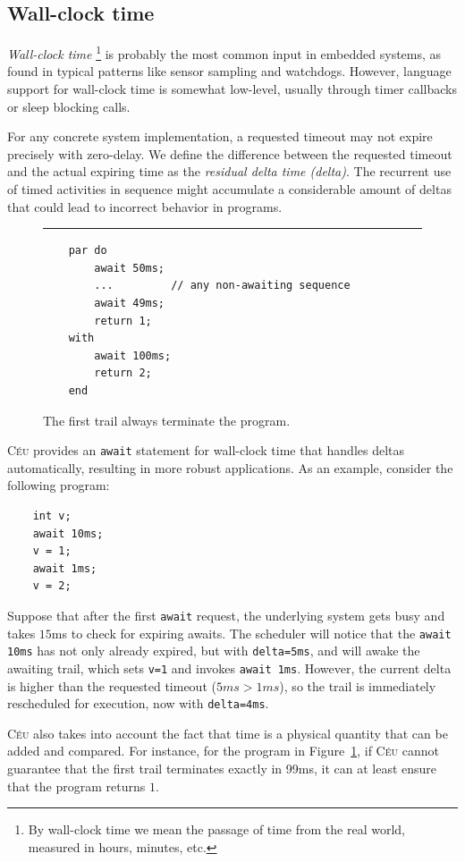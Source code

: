 \documentclass{sigplan-proc}
\newcommand{\2}{\;\;}
\newcommand{\5}{\;\;\;\;\;}
\newcommand{\CEU}{\textsc{C\'{e}u}}
\newcommand{\code}[1] {{\small{\texttt{#1}}}}
\begin{document}
\subsection{Wall-clock time}
\label{sec:ceu:time}

\emph{Wall-clock time}%
\footnote{
By wall-clock time we mean the passage of time from the real world, measured in 
hours, minutes, etc.
}
is probably the most common input in embedded systems, as found in typical 
patterns like sensor sampling and watchdogs.
However, language support for wall-clock time is somewhat low-level, usually 
through timer callbacks or sleep blocking calls.

For any concrete system implementation, a requested timeout may not expire 
precisely with zero-delay.
We define the difference between the requested timeout and the actual expiring 
time as the \emph{residual delta time (delta)}.
The recurrent use of timed activities in sequence might accumulate a 
considerable amount of deltas that could lead to incorrect behavior in 
programs.

\begin{figure}[t]
\rule{8.5cm}{0.37pt}
{\small
\begin{verbatim}
    par do
        await 50ms;
        ...         // any non-awaiting sequence
        await 49ms;
        return 1;
    with
        await 100ms;
        return 2;
    end
\end{verbatim}
}
\caption{ The first trail always terminate the program.
\label{lst:ceu:time}
}
\end{figure}

\CEU{} provides an \code{await} statement for wall-clock time that handles 
deltas automatically, resulting in more robust applications.
As an example, consider the following program:
{\small
\begin{verbatim}
    int v;
    await 10ms;
    v = 1;
    await 1ms;
    v = 2;
\end{verbatim}
}
Suppose that after the first \code{await} request, the underlying system gets 
busy and takes $15$ms to check for expiring awaits.
The scheduler will notice that the \code{await 10ms} has not only already 
expired, but with \code{delta=5ms}, and will awake the awaiting trail, which 
sets \code{v=1} and invokes \code{await 1ms}.
However, the current delta is higher than the requested timeout ($5ms > 1ms$), 
so the trail is immediately rescheduled for execution, now with 
\code{delta=4ms}.

\CEU{} also takes into account the fact that time is a physical quantity that 
can be added and compared.
For instance, for the program in Figure~\ref{lst:ceu:time}, if \CEU{} cannot 
guarantee that the first trail terminates exactly in 99ms, it can at least 
ensure that the program returns $1$.
\end{document}

